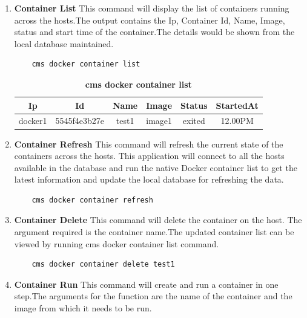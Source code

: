 \documentclass[9pt,twocolumn,twoside]{../../styles/osajnl}
\begin{document}
\begin{enumerate}
    \item \textbf{Container List}
     This command will display the list of containers running across the hosts.The output contains the Ip, Container Id, Name, Image, status and start time of the container.The details would be shown from the local database maintained.
     
    \begin{verbatim}
    cms docker container list
    \end{verbatim}  
        
     \begin{table}[h!]
     \caption{\bf cms docker container list }
     \begin{tabular}{cccccc}
     \hline
      Ip & Id & Name & Image &Status&StartedAt\\
      \hline
      docker1 & 5545f4e3b27e & test1 & image1 &exited & 12.00PM \\
     \hline
     \end{tabular}
     \label{tab:tab3}
     \end{table}
     
    \item \textbf{Container Refresh}
     This command will refresh the current state of the containers across the hosts. This application will connect to all the hosts available in the database and run the native Docker container list to get the latest information and update the local database for refreshing the data. \\
     
    \begin{verbatim}
    cms docker container refresh
    \end{verbatim}  
    
    \item \textbf{Container Delete}
     This command will delete the container on the host. The argument required is the container name.The updated container list can be viewed by running cms docker container list command.\\
     
    \begin{verbatim}
    cms docker container delete test1 
    \end{verbatim}  
    
    
    \item \textbf{Container Run}
     This command will create and run a container in one step.The arguments for the function are the name of the container and the image from which it needs to be run.\\
     

\end{enumerate}
\end{document}
